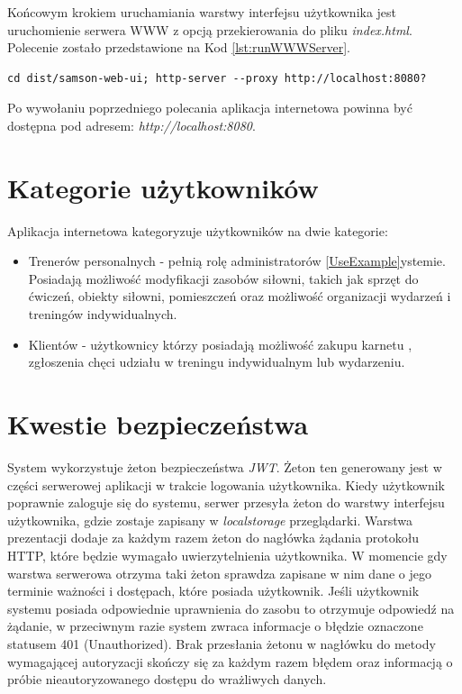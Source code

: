\documentclass[a4paper,twoside,12pt]{book}
\begin{document}
Końcowym krokiem uruchamiania warstwy interfejsu użytkownika jest uruchomienie serwera WWW z opcją przekierowania do pliku \textit{index.html}. Polecenie zostało przedstawione na Kod \ref{lst:runWWWServer}.
\begin{lstlisting}[caption={Polecenie, które tworzy paczkę możliwą do uruchomienia przez serwer WWW}, label={lst:runWWWServer}]
	cd dist/samson-web-ui; http-server --proxy http://localhost:8080?
\end{lstlisting}

Po wywołaniu poprzedniego polecania aplikacja internetowa powinna być dostępna pod adresem: \textit{http://localhost:8080}.

\section {Kategorie użytkowników}

Aplikacja internetowa kategoryzuje użytkowników na dwie kategorie:
\begin{itemize}
	\item Trenerów personalnych - pełnią rolę administratorów \ref{UseExample}ystemie. Posiadają możliwość modyfikacji zasobów siłowni, takich jak sprzęt do ćwiczeń, obiekty siłowni, pomieszczeń oraz możliwość organizacji wydarzeń i treningów indywidualnych.
	\item Klientów - użytkownicy którzy posiadają możliwość zakupu karnetu , zgłoszenia chęci udziału w treningu indywidualnym lub wydarzeniu.
\end{itemize}

\section {Kwestie bezpieczeństwa}

System wykorzystuje żeton bezpieczeństwa \textit{JWT}. Żeton ten generowany jest w części serwerowej aplikacji w trakcie logowania użytkownika. Kiedy użytkownik poprawnie zaloguje się do systemu, serwer przesyła żeton do warstwy interfejsu użytkownika, gdzie zostaje zapisany w \textit{localstorage} przeglądarki. Warstwa prezentacji dodaje za każdym razem żeton do nagłówka żądania protokołu HTTP, które będzie wymagało uwierzytelnienia użytkownika. W momencie gdy warstwa serwerowa otrzyma taki żeton sprawdza zapisane w nim dane o jego terminie ważności i dostępach, które posiada użytkownik. Jeśli użytkownik systemu posiada odpowiednie uprawnienia do zasobu to otrzymuje odpowiedź na żądanie, w przeciwnym razie system zwraca informacje o błędzie oznaczone statusem 401 (Unauthorized). Brak przesłania żetonu w nagłówku do metody wymagającej autoryzacji skończy się za każdym razem błędem oraz informacją o próbie nieautoryzowanego dostępu do wrażliwych danych.
\end{document}
